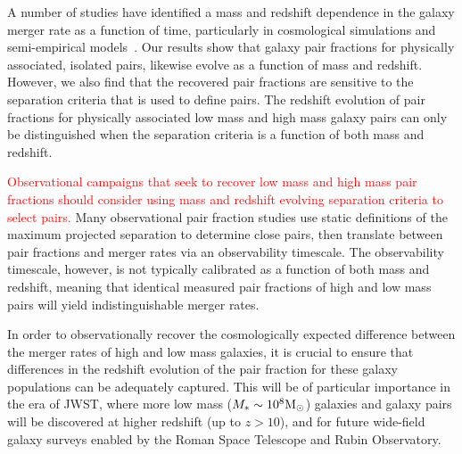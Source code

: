 \documentclass[twocolumn]{aastex631}
\newcommand{\add}[1]{\textcolor{red}{#1}}
\begin{document}
    A number of studies have identified a mass and redshift dependence in the galaxy merger rate as a function of time, particularly in cosmological simulations and semi-empirical models~\cite[see e.g.][]{Stewart2009,Hopkins2010,RG2015}. 
    Our results show that galaxy pair fractions for physically associated, isolated pairs, likewise evolve as a function of mass and redshift. 
    However, we also find that the recovered pair fractions are sensitive to the separation criteria that is used to define pairs.
    The redshift evolution of pair fractions for physically associated low mass and high mass galaxy pairs can only be distinguished when the separation criteria is a function of both mass and redshift.

    \add{Observational campaigns that seek to recover low mass and high mass pair fractions should consider using mass and redshift evolving separation criteria to select pairs.}
    Many observational pair fraction studies use static definitions of the maximum projected separation to determine close pairs, then translate between pair fractions and merger rates via an observability timescale. 
    The observability timescale, however, is not typically calibrated as a function of both mass and redshift, meaning that identical measured pair fractions of high and low mass pairs will yield indistinguishable merger rates. 
    
    In order to observationally recover the cosmologically expected difference between the merger rates of high and low mass galaxies, it is crucial to ensure that differences in the redshift evolution of the pair fraction for these galaxy populations can be adequately captured. 
    This will be of particular importance in the era of JWST, where more low mass ($M_*\sim10^8 \mathrm{M}_\odot$) galaxies and galaxy pairs will be discovered at higher redshift (up to $z>10$), and for future wide-field galaxy surveys enabled by the Roman Space Telescope and Rubin Observatory. 


\end{document}
